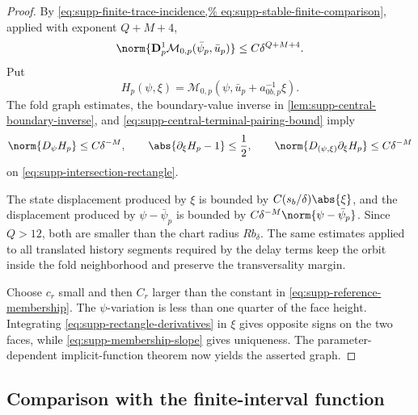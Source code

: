\begin{proof}
By \cref{eq:supp-finite-trace-incidence,%
eq:supp-stable-finite-comparison}, applied with exponent \(Q+M+4\),
\begin{equation}
 \norm{\mathbf D_p^1
   \mathcal M_{0,p}(\bar\psi_p,\bar u_p)}
 \le C\delta^{Q+M+4}.
 \label{eq:supp-reference-membership}
\end{equation}
Put
\[
 H_p(\psi,\xi)=
 \mathcal M_{0,p}
   (\psi,\bar u_p+a_{0b,p}^{-1}\xi).
\]
The fold graph estimates, the boundary-value inverse in
\cref{lem:supp-central-boundary-inverse}, and
\cref{eq:supp-central-terminal-pairing-bound} imply
\begin{equation}
 \norm{D_\psi H_p}\le C\delta^{-M},
 \qquad
 \abs{\partial_\xi H_p-1}\le\frac12,
 \qquad
 \norm{D_{(\psi,\xi)}\partial_\xi H_p}
 \le C\delta^{-M}
 \label{eq:supp-rectangle-derivatives}
\end{equation}
on \cref{eq:supp-intersection-rectangle}.

The state displacement produced by \(\xi\) is bounded by
\(C(s_b/\delta)\abs{\xi}\), and the displacement produced by
\(\psi-\bar\psi_p\) is bounded by
\(C\delta^{-M}\norm{\psi-\bar\psi_p}\).  Since \(Q>12\), both are
smaller than the chart radius
\(Rb_\delta\).  The same estimates applied to all translated history
segments required by the delay terms keep the orbit inside the fold
neighborhood and preserve the transversality margin.

Choose \(c_r\) small and then \(C_r\) larger than the constant in
\cref{eq:supp-reference-membership}.  The \(\psi\)-variation is less than
one quarter of the face height.  Integrating
\cref{eq:supp-rectangle-derivatives} in \(\xi\) gives opposite signs on
the two faces, while \cref{eq:supp-membership-slope} gives uniqueness.
The parameter-dependent implicit-function theorem now yields the asserted
graph.
\end{proof}

\subsection{Comparison with the finite-interval function}


